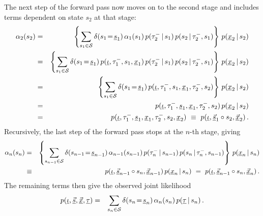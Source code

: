 \documentclass[a4paper]{article}
\newcommand{\ui}{\underline{\iota}}
\newcommand{\ut}{\underline{\tau}}
\begin{document}
The next step of the forward pass now moves on to the second stage and includes terms dependent on state $s_2$ at that stage:
\begin{eqnarray}
  \alpha_2(s_2) & = & 
\left\{\sum_{s_1\in{\cal S}}\delta(s_1\!=\!\underline{s}_1)\,
\alpha_1(s_1)\,p(\tau^-_2\,|\,s_1)\,p(s_2\,|\,\tau^-_2,s_1)\right\}
\,p(\underline{x}_2\,|\,s_2)
\nonumber\\&=&
\left\{\sum_{s_1\in{\cal S}}\delta(s_1\!=\!\underline{s}_1)\,
p(\ui,\tau^-_1,s_1,\underline{x}_1)\,p(\tau^-_2\,|\,s_1)\,p(s_2\,|\,\tau^-_2,s_1)\right\}
\,p(\underline{x}_2\,|\,s_2)
\nonumber\\&=&
\left\{\sum_{s_1\in{\cal S}}\delta(s_1\!=\!\underline{s}_1)\,
p(\ui,\tau^-_1,s_1,\underline{x}_1,\tau^-_2,s_2)\right\}
\,p(\underline{x}_2\,|\,s_2)
\nonumber\\&=&
p(\ui,\tau^-_1,\underline{s}_1,\underline{x}_1,\tau^-_2,s_2)\,p(\underline{x}_2\,|\,s_2)
\nonumber\\&=&
p(\ui,\tau^-_1,\underline{s}_1,\underline{x}_1,\tau^-_2,s_2,\underline{x}_2)
~\equiv~p(\ui,\underline{\vec{s}}_1\circ s_2,\underline{\vec{x}}_2)
\,.
\label{eq:alpha_2}
\end{eqnarray}
Recursively, the last step of the forward pass stops at the $n$-th stage, giving
\begin{eqnarray}
  \alpha_n(s_n) & = & 
\left\{\sum_{s_{n-1}\in{\cal S}}\delta(s_{n-1}\!=\!\underline{s}_{n-1})\,
\alpha_{n-1}(s_{n-1})\,p(\tau^-_n\,|\,s_{n-1})\,p(s_n\,|\,\tau^-_n,s_{n-1})\right\}
\,p(\underline{x}_n\,|\,s_n)
\nonumber\\&\equiv&
p(\ui,\underline{\vec{s}}_{n-1}\circ s_n,\underline{\vec{x}}_{n-1})\,p(\underline{x}_n\,|\,s_n)
~=~p(\ui,\underline{\vec{s}}_{n-1}\circ s_n,\underline{\vec{x}}_n)
\,.
\label{eq:alpha_n}
\end{eqnarray}
The remaining terms then give the observed joint likelihood
\begin{eqnarray}
   p(\ui,\underline{\vec{s}},\underline{\vec{x}},\ut) 
& = & 
   \sum_{s_n\in{\cal S}}\delta(s_n\!=\!\underline{s}_n)\,\alpha_n(s_n)\,p(\ut\,|\,s_n)\,.
\label{eq:alpha_n_beta_n}
\end{eqnarray}
\end{document}
